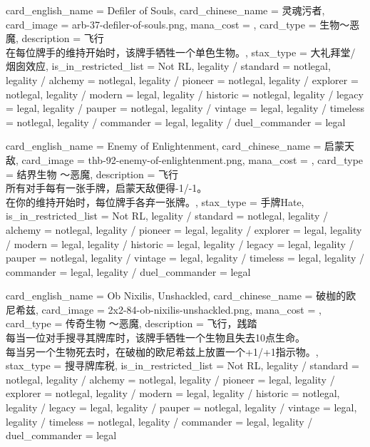\documentclass[lang = cn, color = black, 10pt]{AllThatStax}
\begin{document}
\card
{
	card_english_name = {Defiler of Souls},
	card_chinese_name = {灵魂污者},
	card_image = arb-37-defiler-of-souls.png,
	mana_cost = ,
	card_type = 生物～恶魔,
	description = {飞行\\
		在每位牌手的维持开始时，该牌手牺牲一个单色生物。},
	stax_type = 大礼拜堂/烟囱效应,
	is_in_restricted_list = Not RL,
	legality / standard = notlegal,
	legality / alchemy = notlegal,
	legality / pioneer = notlegal,
	legality / explorer = notlegal,
	legality / modern = legal,
	legality / historic = notlegal,
	legality / legacy = legal,
	legality / pauper = notlegal,
	legality / vintage = legal,
	legality / timeless = notlegal,
	legality / commander = legal,
	legality / duel_commander = legal
}

\card
{
	card_english_name = {Enemy of Enlightenment},
	card_chinese_name = {启蒙天敌},
	card_image = thb-92-enemy-of-enlightenment.png,
	mana_cost = ,
	card_type = 结界生物 ～恶魔,
	description = {飞行\\
		所有对手每有一张手牌，启蒙天敌便得-1/-1。\\
		在你的维持开始时，每位牌手各弃一张牌。},
	stax_type = 手牌Hate,
	is_in_restricted_list = Not RL,
	legality / standard = notlegal,
	legality / alchemy = notlegal,
	legality / pioneer = legal,
	legality / explorer = legal,
	legality / modern = legal,
	legality / historic = legal,
	legality / legacy = legal,
	legality / pauper = notlegal,
	legality / vintage = legal,
	legality / timeless = legal,
	legality / commander = legal,
	legality / duel_commander = legal
}

\card
{
	card_english_name = {Ob Nixilis, Unshackled},
	card_chinese_name = {破枷的欧尼希兹},
	card_image = 2x2-84-ob-nixilis-unshackled.png,
	mana_cost = ,
	card_type = 传奇生物 ～恶魔,
	description = {飞行，践踏\\
		每当一位对手搜寻其牌库时，该牌手牺牲一个生物且失去10点生命。\\
		每当另一个生物死去时，在破枷的欧尼希兹上放置一个+1/+1指示物。},
	stax_type = 搜寻牌库税,
	is_in_restricted_list = Not RL,
	legality / standard = notlegal,
	legality / alchemy = notlegal,
	legality / pioneer = legal,
	legality / explorer = notlegal,
	legality / modern = legal,
	legality / historic = notlegal,
	legality / legacy = legal,
	legality / pauper = notlegal,
	legality / vintage = legal,
	legality / timeless = notlegal,
	legality / commander = legal,
	legality / duel_commander = legal
}
\end{document}
